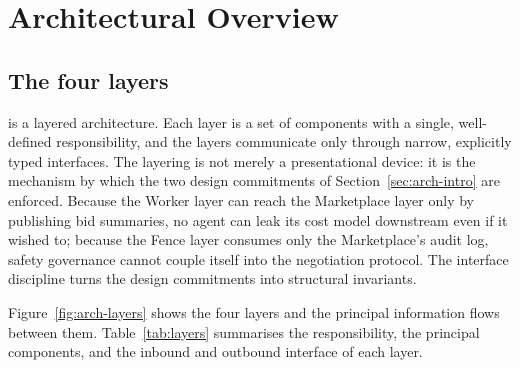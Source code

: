 \section{Architectural Overview}
\label{sec:arch-overview}

\subsection{The four layers}
\label{subsec:four-layers}

\NEXUS{} is a layered architecture. Each layer is a set of components
with a single, well-defined responsibility, and the layers communicate
only through narrow, explicitly typed interfaces. The layering is not
merely a presentational device: it is the mechanism by which the two
design commitments of Section~\ref{sec:arch-intro} are enforced. Because
the Worker layer can reach the Marketplace layer only by publishing bid
summaries, no agent can leak its cost model downstream even if it
wished to; because the Fence layer consumes only the Marketplace's
audit log, safety governance cannot couple itself into the negotiation
protocol. The interface discipline turns the design commitments into
structural invariants.

Figure~\ref{fig:arch-layers} shows the four layers and the principal
information flows between them. Table~\ref{tab:layers} summarises the
responsibility, the principal components, and the inbound and outbound
interface of each layer.


